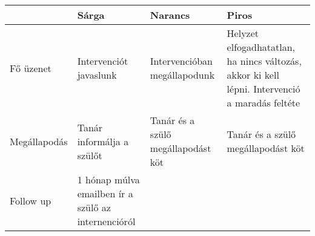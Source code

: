 \begin{longtable}[]{@{}llll@{}}
\toprule
\begin{minipage}[b]{0.09\columnwidth}\raggedright
\strut
\end{minipage} & \begin{minipage}[b]{0.19\columnwidth}\raggedright
Sárga\strut
\end{minipage} & \begin{minipage}[b]{0.18\columnwidth}\raggedright
Narancs\strut
\end{minipage} & \begin{minipage}[b]{0.43\columnwidth}\raggedright
Piros\strut
\end{minipage}\tabularnewline
\midrule
\endhead
\begin{minipage}[t]{0.09\columnwidth}\raggedright
Fő üzenet\strut
\end{minipage} & \begin{minipage}[t]{0.19\columnwidth}\raggedright
Intervenciót javaslunk\strut
\end{minipage} & \begin{minipage}[t]{0.18\columnwidth}\raggedright
Intervencióban megállapodunk\strut
\end{minipage} & \begin{minipage}[t]{0.43\columnwidth}\raggedright
Helyzet elfogadhatatlan, ha nincs változás, akkor ki kell lépni.
Intervenció a maradás feltéte\strut
\end{minipage}\tabularnewline
\begin{minipage}[t]{0.09\columnwidth}\raggedright
Megállapodás\strut
\end{minipage} & \begin{minipage}[t]{0.19\columnwidth}\raggedright
Tanár informálja a szülőt\strut
\end{minipage} & \begin{minipage}[t]{0.18\columnwidth}\raggedright
Tanár és a szülő megállapodást köt\strut
\end{minipage} & \begin{minipage}[t]{0.43\columnwidth}\raggedright
Tanár és a szülő megállapodást köt\strut
\end{minipage}\tabularnewline
\begin{minipage}[t]{0.09\columnwidth}\raggedright
Follow up\strut
\end{minipage} & \begin{minipage}[t]{0.19\columnwidth}\raggedright
1 hónap múlva emailben ír a szülő az internencióról\strut
\end{minipage} & \begin{minipage}[t]{0.18\columnwidth}\raggedright

\end{minipage}
\end{longtable}
